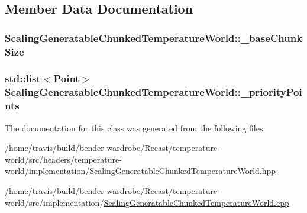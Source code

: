 \subsection{Member Data Documentation}
\hypertarget{class_scaling_generatable_chunked_temperature_world_aed44afc3904f0ee4317a6acaad217049}{
\subsubsection[{\-\_\-base\-Chunk\-Size}]{ Scaling\-Generatable\-Chunked\-Temperature\-World\-::\-\_\-base\-Chunk\-Size\hspace{0.3cm}{\ttfamily [protected]}}}\label{class_scaling_generatable_chunked_temperature_world_aed44afc3904f0ee4317a6acaad217049}
\hypertarget{class_scaling_generatable_chunked_temperature_world_a4f47190e0467638a518f350eb1a3292f}{
\subsubsection[{\-\_\-priority\-Points}]{\setlength{\rightskip}{0pt plus 5cm}std\-::list$<${\bf Point}$>$ Scaling\-Generatable\-Chunked\-Temperature\-World\-::\-\_\-priority\-Points\hspace{0.3cm}{\ttfamily [protected]}}}\label{class_scaling_generatable_chunked_temperature_world_a4f47190e0467638a518f350eb1a3292f}


The documentation for this class was generated from the following files\-:\begin{DoxyCompactItemize}
\item 
/home/travis/build/bender-\/wardrobe/\-Recast/temperature-\/world/src/headers/temperature-\/world/implementation/\hyperlink{_scaling_generatable_chunked_temperature_world_8hpp}{Scaling\-Generatable\-Chunked\-Temperature\-World.\-hpp}\item 
/home/travis/build/bender-\/wardrobe/\-Recast/temperature-\/world/src/implementation/\hyperlink{_scaling_generatable_chunked_temperature_world_8cpp}{Scaling\-Generatable\-Chunked\-Temperature\-World.\-cpp}\end{DoxyCompactItemize}
